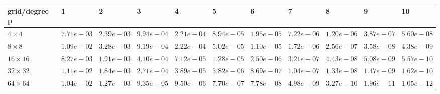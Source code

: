 \begin{tabular}{lllllllllll}
\hline
 grid/degree p   & 1          & 2          & 3          & 4          & 5          & 6          & 7          & 8          & 9          & 10         \\
\hline
 $4 \times 4$    & $7.71e-03$ & $2.39e-03$ & $9.94e-04$ & $2.21e-04$ & $8.94e-05$ & $1.95e-05$ & $7.22e-06$ & $1.20e-06$ & $3.87e-07$ & $5.60e-08$ \\
 $8 \times 8$    & $1.09e-02$ & $3.28e-03$ & $9.19e-04$ & $2.22e-04$ & $5.02e-05$ & $1.10e-05$ & $1.72e-06$ & $2.56e-07$ & $3.58e-08$ & $4.38e-09$ \\
 $16 \times 16$  & $8.27e-03$ & $1.91e-03$ & $4.10e-04$ & $7.12e-05$ & $1.28e-05$ & $2.50e-06$ & $3.21e-07$ & $4.43e-08$ & $5.08e-09$ & $5.57e-10$ \\
 $32 \times 32$  & $1.11e-02$ & $1.84e-03$ & $2.71e-04$ & $3.89e-05$ & $5.82e-06$ & $8.69e-07$ & $1.04e-07$ & $1.33e-08$ & $1.47e-09$ & $1.62e-10$ \\
 $64 \times 64$  & $1.04e-02$ & $1.27e-03$ & $9.35e-05$ & $9.50e-06$ & $7.70e-07$ & $7.78e-08$ & $4.98e-09$ & $3.27e-10$ & $1.96e-11$ & $1.05e-12$ \\
\hline
\end{tabular}
